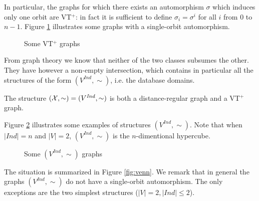 \documentclass{llncs}
\begin{document}
In particular, the graphs  for which there exists an automorphism $\sigma$ which induces only one orbit are VT$^+$: in fact it is sufficient to define $\sigma_i=\sigma^i$ for all $i$ from $0$ to $n-1$. Figure \ref{fig:hexagons} illustrates some graphs with a single-orbit automorphism. 


\begin{figure}[th]\centering
		\qquad
		\qquad
		\caption{Some VT$^+$ graphs}
		\label{fig:hexagons}	
	\end{figure}
	
From graph theory we know that neither of the  two classes subsumes the other. They have however a non-empty intersection, which contains in particular  all  the structures of the form $(V^\mathit{Ind},\sim)$, i.e. the database domains.

\begin{proposition}\label{prop:grap-databases}
The structure $({\cal X},\sim) = (V^\mathit{Ind},\sim)$ is both a distance-regular graph  and a VT$^+$ graph.
\end{proposition}

Figure \ref{fig:hypercubes} illustrates some examples of structures  $(V^\mathit{Ind},\sim)$. Note that when $|\mathit{Ind}| = n$ and $|V|=2$, $(V^\mathit{Ind},\sim)$ is the $n$-dimentional hypercube. 

\begin{figure}[th]\centering
		\qquad
		\caption{Some $(V^\mathit{Ind},\sim)$ graphs}
		\label{fig:hypercubes}	
		\vspace{.5cm}
	\end{figure}

The situation is summarized in Figure \ref{fig:venn}. We remark that in general the graphs $(V^\mathit{Ind},\sim)$ do not have a single-orbit automorphism. The only exceptions are the two simplest structures ($|V|=2, |\mathit{Ind}| \leq 2$). 
\end{document}
